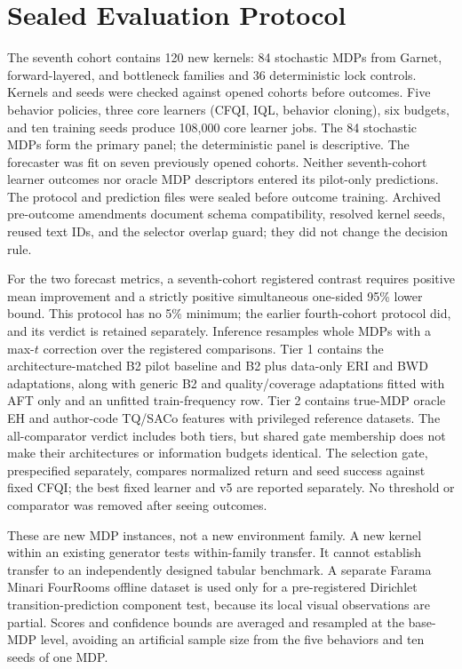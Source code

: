 \section{Sealed Evaluation Protocol}
\label{sec:protocol}
The seventh cohort contains 120 new kernels: 84 stochastic MDPs from Garnet, forward-layered, and bottleneck families and 36 deterministic lock controls. Kernels and seeds were checked against opened cohorts before outcomes. Five behavior policies, three core learners (CFQI, IQL, behavior cloning), six budgets, and ten training seeds produce 108,000 core learner jobs. The 84 stochastic MDPs form the primary panel; the deterministic panel is descriptive. The forecaster was fit on seven previously opened cohorts. Neither seventh-cohort learner outcomes nor oracle MDP descriptors entered its pilot-only predictions. The protocol and prediction files were sealed before outcome training. Archived pre-outcome amendments document schema compatibility, resolved kernel seeds, reused text IDs, and the selector overlap guard; they did not change the decision rule.

For the two forecast metrics, a seventh-cohort registered contrast requires positive mean improvement and a strictly positive simultaneous one-sided 95\% lower bound. This protocol has no 5\% minimum; the earlier fourth-cohort protocol did, and its verdict is retained separately. Inference resamples whole MDPs with a max-$t$ correction over the registered comparisons. Tier 1 contains the architecture-matched B2 pilot baseline and B2 plus data-only ERI and BWD adaptations, along with generic B2 and quality/coverage adaptations fitted with AFT only and an unfitted train-frequency row. Tier 2 contains true-MDP oracle EH and author-code TQ/SACo features with privileged reference datasets. The all-comparator verdict includes both tiers, but shared gate membership does not make their architectures or information budgets identical. The selection gate, prespecified separately, compares normalized return and seed success against fixed CFQI; the best fixed learner and v5 are reported separately. No threshold or comparator was removed after seeing outcomes.

These are new MDP instances, not a new environment family. A new kernel within an existing generator tests within-family transfer. It cannot establish transfer to an independently designed tabular benchmark. A separate Farama Minari FourRooms offline dataset is used only for a pre-registered Dirichlet transition-prediction component test, because its local visual observations are partial. Scores and confidence bounds are averaged and resampled at the base-MDP level, avoiding an artificial sample size from the five behaviors and ten seeds of one MDP.
